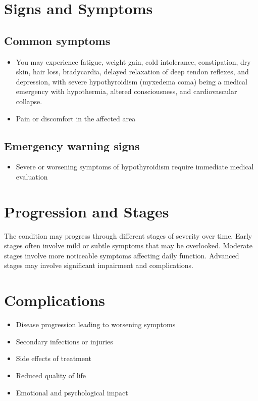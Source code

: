 \section{Signs and Symptoms}

\subsection{Common symptoms}
\begin{itemize}[noitemsep]
  \item You may experience fatigue, weight gain, cold intolerance, constipation, dry skin, hair loss, bradycardia, delayed relaxation of deep tendon reflexes, and depression, with severe hypothyroidism (myxedema coma) being a medical emergency with hypothermia, altered consciousness, and cardiovascular collapse.

  \item Pain or discomfort in the affected area
  \end{itemize}

\subsection{Emergency warning signs}
\begin{itemize}[noitemsep]
  \item Severe or worsening symptoms of hypothyroidism require immediate medical evaluation
\end{itemize}
\section{Progression and Stages}
The condition may progress through different stages of severity over time. Early stages often involve mild or subtle symptoms that may be overlooked. Moderate stages involve more noticeable symptoms affecting daily function. Advanced stages may involve significant impairment and complications.
\section{Complications}
\begin{itemize}[noitemsep]
  \item Disease progression leading to worsening symptoms
  \item Secondary infections or injuries
  \item Side effects of treatment
  \item Reduced quality of life
  \item Emotional and psychological impact
\end{itemize}
